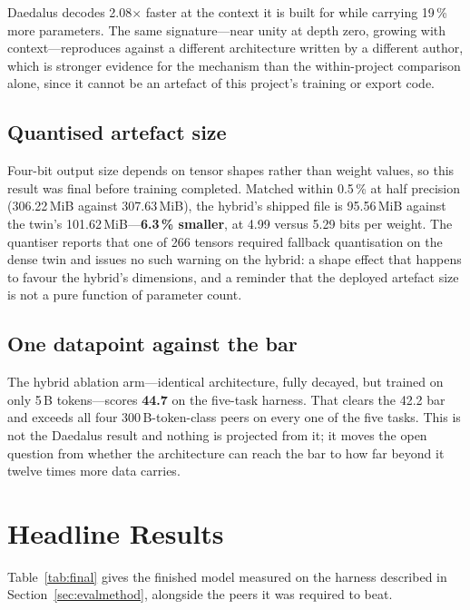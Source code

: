 \documentclass[conference]{IEEEtran}
\begin{document}
Daedalus decodes 2.08$\times$ faster at the context it is built for while
carrying 19\,\% more parameters. The same signature---near unity at depth zero,
growing with context---reproduces against a different architecture written by a
different author, which is stronger evidence for the mechanism than the
within-project comparison alone, since it cannot be an artefact of this
project's training or export code.

\subsection{Quantised artefact size}

Four-bit output size depends on tensor shapes rather than weight values, so this
result was final before training completed. Matched within 0.5\,\% at half
precision (306.22\,MiB against 307.63\,MiB), the hybrid's shipped file is
95.56\,MiB against the twin's 101.62\,MiB---\textbf{6.3\,\% smaller}, at 4.99
versus 5.29 bits per weight. The quantiser reports that one of 266 tensors
required fallback quantisation on the dense twin and issues no such warning on
the hybrid: a shape effect that happens to favour the hybrid's dimensions, and a
reminder that the deployed artefact size is not a pure function of parameter
count.

\subsection{One datapoint against the bar}

The hybrid ablation arm---identical architecture, fully decayed, but trained on
only 5\,B tokens---scores \textbf{44.7} on the five-task harness. That clears the
42.2 bar and exceeds all four 300\,B-token-class peers on every one of the five
tasks. This is not the Daedalus result and nothing is projected from it; it moves
the open question from whether the architecture can reach the bar to how far
beyond it twelve times more data carries.

\section{Headline Results}

Table~\ref{tab:final} gives the finished model measured on the harness described
in Section~\ref{sec:evalmethod}, alongside the peers it was required to beat.
\end{document}
